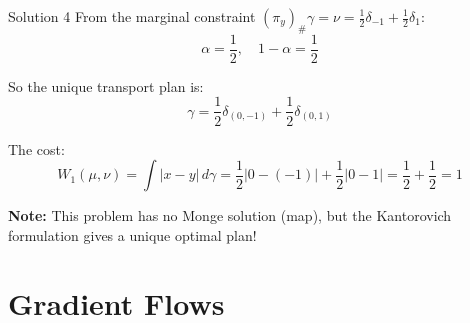 \documentclass[aspectratio=169]{beamer}
\begin{document}
\begin{frame}{Solution 4}
From the marginal constraint $(\pi_y)_\#\gamma = \nu = \frac{1}{2}\delta_{-1} + \frac{1}{2}\delta_1$:
\[
\alpha = \frac{1}{2}, \quad 1-\alpha = \frac{1}{2}
\]

So the unique transport plan is:
\[
\gamma = \frac{1}{2}\delta_{(0,-1)} + \frac{1}{2}\delta_{(0,1)}
\]

\vspace{0.3cm}
The cost:
\[
W_1(\mu,\nu) = \int |x-y|\,d\gamma = \frac{1}{2}|0-(-1)| + \frac{1}{2}|0-1| = \frac{1}{2} + \frac{1}{2} = 1
\]

\vspace{0.3cm}
\textbf{Note:} This problem has no Monge solution (map), but the Kantorovich formulation gives a unique optimal plan!
\end{frame}

\section{Gradient Flows}
\end{document}

